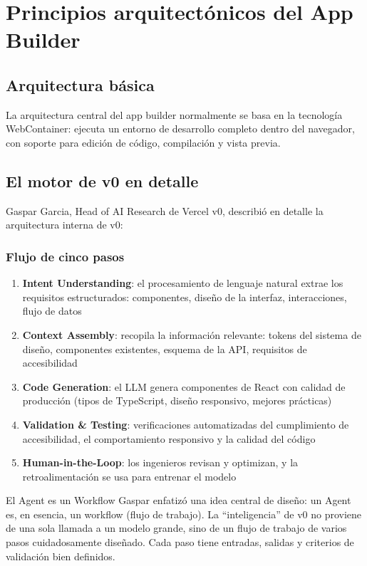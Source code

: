 \section{Principios arquitectónicos del App Builder}

\subsection{Arquitectura básica}

La arquitectura central del app builder normalmente se basa en la tecnología WebContainer: ejecuta un entorno de desarrollo completo dentro del navegador, con soporte para edición de código, compilación y vista previa.

\subsection{El motor de v0 en detalle}

Gaspar Garcia, Head of AI Research de Vercel v0, describió en detalle la arquitectura interna de v0:

\subsubsection{Flujo de cinco pasos}

\begin{enumerate}
    \item \textbf{Intent Understanding}: el procesamiento de lenguaje natural extrae los requisitos estructurados: componentes, diseño de la interfaz, interacciones, flujo de datos
    \item \textbf{Context Assembly}: recopila la información relevante: tokens del sistema de diseño, componentes existentes, esquema de la API, requisitos de accesibilidad
    \item \textbf{Code Generation}: el LLM genera componentes de React con calidad de producción (tipos de TypeScript, diseño responsivo, mejores prácticas)
    \item \textbf{Validation \& Testing}: verificaciones automatizadas del cumplimiento de accesibilidad, el comportamiento responsivo y la calidad del código
    \item \textbf{Human-in-the-Loop}: los ingenieros revisan y optimizan, y la retroalimentación se usa para entrenar el modelo
\end{enumerate}

\begin{importantbox}{El Agent es un Workflow}
Gaspar enfatizó una idea central de diseño: un Agent es, en esencia, un workflow (flujo de trabajo). La ``inteligencia'' de v0 no proviene de una sola llamada a un modelo grande, sino de un flujo de trabajo de varios pasos cuidadosamente diseñado. Cada paso tiene entradas, salidas y criterios de validación bien definidos.
\end{importantbox}


